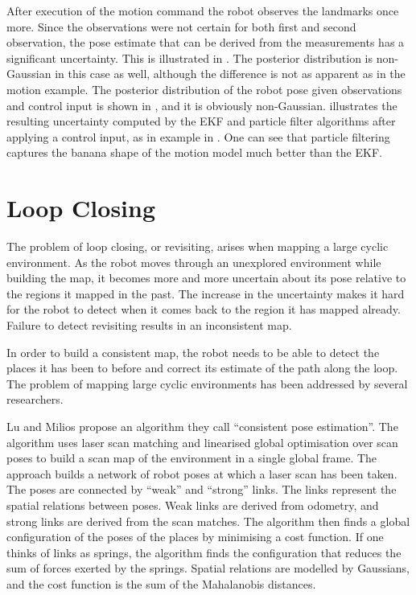After execution of the motion command the robot observes the landmarks
once more. Since the observations were not certain for both first and
second observation, the pose estimate that can be derived from the
measurements has a significant uncertainty. This is illustrated in
. The posterior distribution is non-Gaussian
in this case as well, although the difference is not as apparent as in
the motion example. The posterior distribution of the robot pose given
observations and control input is shown in
, and it is obviously non-Gaussian.
 illustrates the resulting uncertainty
computed by the EKF and particle filter algorithms after applying a
control input, as in example in . One can see
that particle filtering captures the banana shape of the motion model
much better than the EKF.


\section{Loop Closing}
\label{sec:back_loop}

The problem of loop closing, or revisiting, arises when mapping a
large cyclic environment. As the robot moves through an unexplored
environment while building the map, it becomes more and more uncertain
about its pose relative to the regions it mapped in the past. The
increase in the uncertainty makes it hard for the robot to detect when
it comes back to the region it has mapped already. Failure to detect
revisiting results in an inconsistent map.

In order to build a consistent map, the robot needs to be able to
detect the places it has been to before and correct its estimate of
the path along the loop. The problem of mapping large cyclic
environments has been addressed by several researchers.




Lu and Milios \cite{lu97:_global} propose an algorithm they call
``consistent pose estimation''. The algorithm uses laser scan matching
and linearised global optimisation over scan poses to build a scan map
of the environment in a single global frame. The approach builds a
network of robot poses at which a laser scan has been taken. The poses
are connected by ``weak'' and ``strong'' links. The links represent
the spatial relations between poses. Weak links are derived from
odometry, and strong links are derived from the scan matches. The
algorithm then finds a global configuration of the poses of the places
by minimising a cost function. If one thinks of links as springs, the
algorithm finds the configuration that reduces the sum of forces
exerted by the springs. Spatial relations are modelled by Gaussians,
and the cost function is the sum of the Mahalanobis distances.

